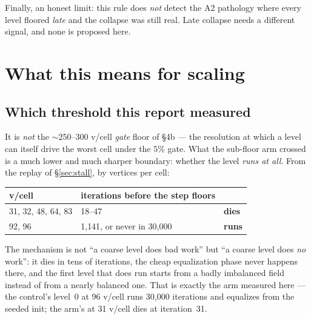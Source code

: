 \documentclass[11pt,a4paper]{article}
\begin{document}
Finally, an honest limit: this rule does \emph{not} detect the A2 pathology
where every level floored \emph{late} and the collapse was still real. Late
collapse needs a different signal, and none is proposed here.

\section{What this means for scaling}
\label{sec:scaling}

\subsection{Which threshold this report measured}

It is \emph{not} the \(\sim\!250\text{--}300\) v/cell \emph{gate} floor of
 \S4b --- the
resolution at which a level can itself drive the worst cell under the \(5\%\)
gate. What the sub-floor arm crossed is a much lower and much sharper boundary:
whether the level \emph{runs at all}. From the replay of \S\ref{sec:stall}, by
vertices per cell:

\begin{center}
\small
\begin{tabular}{@{}lll@{}}
\toprule
v/cell & iterations before the step floors & \\
\midrule
31, 32, 48, 64, 83 & 18--47 & \textbf{dies} \\
92, 96 & 1{,}141, or never in 30{,}000 & \textbf{runs} \\
\bottomrule
\end{tabular}
\end{center}

The mechanism is not ``a coarse level does bad work'' but ``a coarse level does
\emph{no} work'': it dies in tens of iterations, the cheap equalization phase
never happens there, and the first level that does run starts from a badly
imbalanced field instead of from a nearly balanced one. That is exactly the arm
measured here --- the control's level~0 at 96 v/cell runs 30{,}000 iterations and
equalizes from the seeded init; the arm's at 31 v/cell dies at iteration~31.
\end{document}
